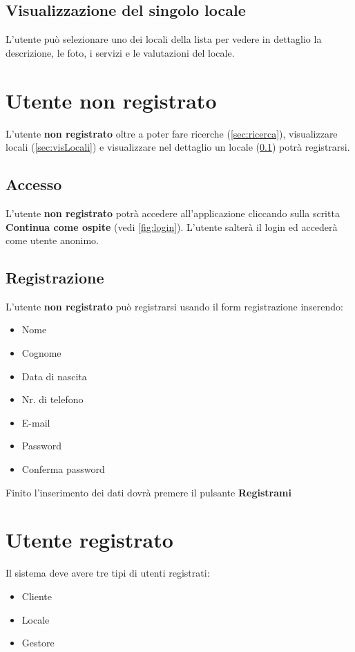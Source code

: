\subsection{Visualizzazione del singolo locale} \label{sec:visLocale}
L'utente può selezionare uno dei locali della lista per vedere in dettaglio la descrizione, le foto, i servizi e le
valutazioni del locale.

\section{Utente non registrato}
L'utente \textbf{non registrato} oltre a poter fare ricerche (\ref{sec:ricerca}), visualizzare locali 
(\ref{sec:visLocali}) e visualizzare nel dettaglio un locale (\ref{sec:visLocale}) potrà registrarsi.

\subsection{Accesso}
L'utente \textbf{non registrato} potrà accedere all'applicazione cliccando sulla scritta \textbf{Continua come ospite}
(vedi \ref{fig:login}). L'utente salterà il login ed accederà come utente anonimo.


\subsection{Registrazione}\label{sec:registrazione}
L'utente \textbf{non registrato} può registrarsi usando il form registrazione inserendo:
\begin{itemize}
    \item Nome
    \item Cognome
    \item Data di nascita
    \item Nr. di telefono
    \item E-mail
    \item Password
    \item Conferma password
    \label{itm:datiPersonali}
\end{itemize}
Finito l'inserimento dei dati dovrà premere il pulsante \textbf{Registrami}

\section{Utente registrato}
Il sistema deve avere tre tipi di utenti registrati:
\begin{itemize}
    \item Cliente
    \item Locale
    \item Gestore
\end{itemize}

